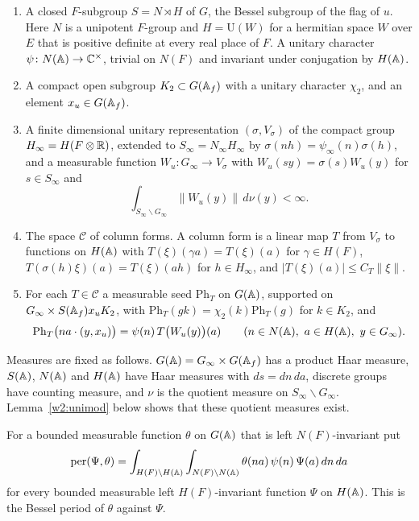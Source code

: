\begin{enumerate}[label=(P\arabic*),leftmargin=*]
\item\label{w2:P1} A closed $F$-subgroup $S=N\rtimes H$ of $G$, the Bessel subgroup of the flag of $u$. Here $N$ is a unipotent $F$-group and $H=\mathrm U(W)$ for a hermitian space $W$ over $E$ that is positive definite at every real place of $F$. A unitary character $\psi\colon N(\mathbb A)\to\mathbb C^\times$, trivial on $N(F)$ and invariant under conjugation by $H(\mathbb A)$.
\item\label{w2:P2} A compact open subgroup $K_2\subset G(\mathbb A_f)$ with a unitary character $\chi_2$, and an element $x_u\in G(\mathbb A_f)$.
\item\label{w2:P3} A finite dimensional unitary representation $(\sigma,V_\sigma)$ of the compact group $H_\infty=H(F\otimes\mathbb R)$, extended to $S_\infty=N_\infty H_\infty$ by $\sigma(nh)=\psi_\infty(n)\sigma(h)$, and a measurable function $W_u\colon G_\infty\to V_\sigma$ with $W_u(sy)=\sigma(s)W_u(y)$ for $s\in S_\infty$ and
\begin{equation}\label{w2:Wint}
\int_{S_\infty\backslash G_\infty}\lVert W_u(y)\rVert\,d\nu(y)<\infty .
\end{equation}
\item\label{w2:P4} The space $\mathcal C$ of column forms. A column form is a linear map $T$ from $V_\sigma$ to functions on $H(\mathbb A)$ with $T(\xi)(\gamma a)=T(\xi)(a)$ for $\gamma\in H(F)$, $T(\sigma(h)\xi)(a)=T(\xi)(ah)$ for $h\in H_\infty$, and $\lvert T(\xi)(a)\rvert\le C_T\lVert\xi\rVert$.
\item\label{w2:P5} For each $T\in\mathcal C$ a measurable seed $\mathrm{Ph}_T$ on $G(\mathbb A)$, supported on $G_\infty\times S(\mathbb A_f)x_uK_2$, with $\mathrm{Ph}_T(gk)=\chi_2(k)\mathrm{Ph}_T(g)$ for $k\in K_2$, and
\begin{equation}\label{w2:seed}
\mathrm{Ph}_T\bigl(na\cdot(y,x_u)\bigr)=\psi(n)\,T\bigl(W_u(y)\bigr)(a)\qquad(n\in N(\mathbb A),\ a\in H(\mathbb A),\ y\in G_\infty).
\end{equation}
\end{enumerate}

Measures are fixed as follows. $G(\mathbb A)=G_\infty\times G(\mathbb A_f)$ has a product Haar measure, $S(\mathbb A)$, $N(\mathbb A)$ and $H(\mathbb A)$ have Haar measures with $ds=dn\,da$, discrete groups have counting measure, and $\nu$ is the quotient measure on $S_\infty\backslash G_\infty$. Lemma~\ref{w2:unimod} below shows that these quotient measures exist.

For a bounded measurable function $\theta$ on $G(\mathbb A)$ that is left $N(F)$-invariant put
\begin{equation}\label{w2:per}
\mathrm{per}(\Psi,\theta)=\int_{H(F)\backslash H(\mathbb A)}\int_{N(F)\backslash N(\mathbb A)}\theta(na)\,\psi(n)\,\Psi(a)\,dn\,da
\end{equation}
for every bounded measurable left $H(F)$-invariant function $\Psi$ on $H(\mathbb A)$. This is the Bessel period of $\theta$ against $\Psi$.

